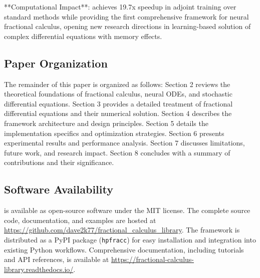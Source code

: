**Computational Impact**: \hpfracc achieves 19.7x speedup in adjoint training over standard methods while providing the first comprehensive framework for neural fractional calculus, opening new research directions in learning-based solution of complex differential equations with memory effects.

\subsection{Paper Organization}

The remainder of this paper is organized as follows: Section 2 reviews the theoretical foundations of fractional calculus, neural ODEs, and stochastic differential equations. Section 3 provides a detailed treatment of fractional differential equations and their numerical solution. Section 4 describes the framework architecture and design principles. Section 5 details the implementation specifics and optimization strategies. Section 6 presents experimental results and performance analysis. Section 7 discusses limitations, future work, and research impact. Section 8 concludes with a summary of contributions and their significance.

\subsection{Software Availability}

\hpfracc is available as open-source software under the MIT license. The complete source code, documentation, and examples are hosted at \url{https://github.com/dave2k77/fractional_calculus_library}. The framework is distributed as a PyPI package (\texttt{hpfracc}) for easy installation and integration into existing Python workflows. Comprehensive documentation, including tutorials and API references, is available at \url{https://fractional-calculus-library.readthedocs.io/}.
